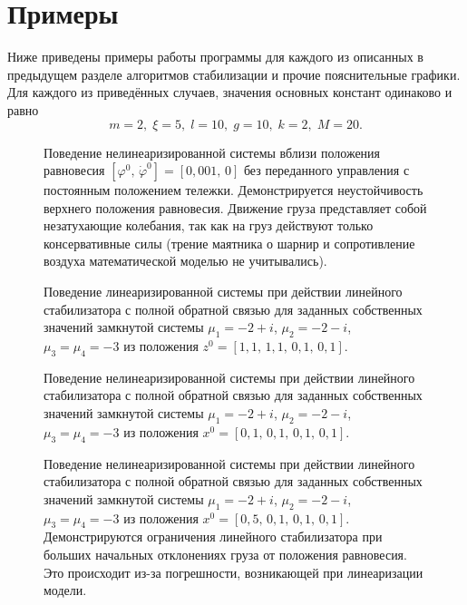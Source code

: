 \section{Примеры}

Ниже приведены примеры работы программы для каждого из описанных в предыдущем разделе алгоритмов стабилизации и прочие пояснительные графики.
Для каждого из приведённых случаев, значения основных констант одинаково и равно
$$
	m = 2,\;
	\xi = 5,\;
	l = 10,\;
	g = 10,\;
	k = 2,\;
	M = 20.
$$
\null
\hfill
\begin{figure}[ht]
	\centering
	
	\caption{Поведение нелинеаризированной системы вблизи положения равновесия $[\varphi^0,\,\dot \varphi^0] = [0,\!001,\,0]$ без переданного управления с постоянным положением тележки. Демонстрируется неустойчивость верхнего положения равновесия. Движение груза представляет собой незатухающие колебания, так как на груз действуют только консервативные силы (трение маятника о шарнир и сопротивление воздуха математической моделью не учитывались).}
\end{figure}

\begin{figure}[t]
	\centering
	
	\caption{Поведение линеаризированной системы при действии линейного стабилизатора с полной обратной связью для заданных собственных значений замкнутой системы $\mu_1 = -2 + i$, $\mu_2 = -2 - i$, $\mu_3 = \mu_4 = -3$ из положения $z^0 = [1,\!1,\,1,\!1,\,0,\!1,\,0,\!1]$.}
\end{figure}

\begin{figure}[t]
	\centering
	
	\caption{Поведение нелинеаризированной системы при действии линейного стабилизатора с полной обратной связью для заданных собственных значений замкнутой системы $\mu_1 = -2 + i$, $\mu_2 = -2 - i$, $\mu_3 = \mu_4 = -3$ из положения $x^0 = [0,\!1,\,0,\!1,\,0,\!1,\,0,\!1]$.}
\end{figure}

\begin{figure}[t]
	\centering
	
	\caption{Поведение нелинеаризированной системы при действии линейного стабилизатора с полной обратной связью для заданных собственных значений замкнутой системы $\mu_1 = -2 + i$, $\mu_2 = -2 - i$, $\mu_3 = \mu_4 = -3$ из положения $x^0 = [0,\!5,\,0,\!1,\,0,\!1,\,0,\!1]$. Демонстрируются ограничения линейного стабилизатора при больших начальных отклонениях груза от положения равновесия. Это происходит из-за погрешности, возникающей при линеаризации модели.}
\end{figure}

